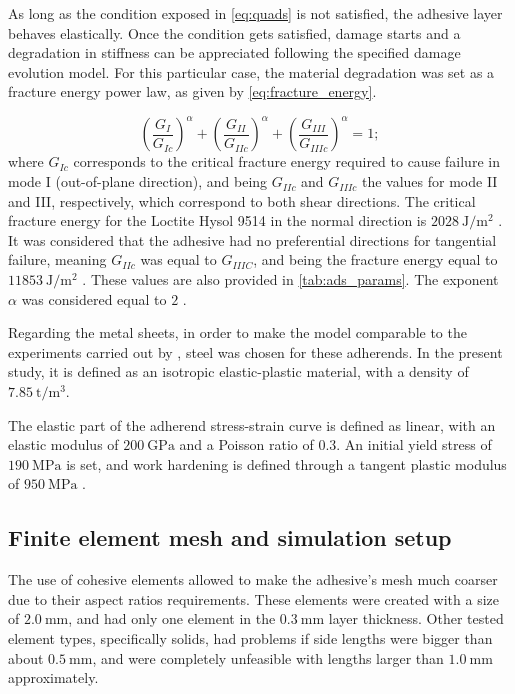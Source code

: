 \documentclass[cmfonts]{witpress}
\begin{document}
As long as the condition exposed in \cref{eq:quads} is not satisfied, the adhesive layer behaves elastically. Once the condition gets satisfied, damage starts and a degradation in stiffness can be appreciated following the specified damage evolution model. For this particular case, the material degradation was set as a fracture energy power law, as given by \cref{eq:fracture_energy}.

\begin{equation}
\left(\frac{G_{I}}{G_{Ic}}\right)^{\alpha}+\left(\frac{G_{II}}{G_{IIc}}\right)^{\alpha}+\left(\frac{G_{III}}{G_{IIIc}}\right)^{\alpha}=1 ;
\label{eq:fracture_energy}
\end{equation}
where $G_{Ic}$ corresponds to the critical fracture energy required to cause failure in mode I (out-of-plane direction), and being $G_{IIc}$ and $G_{IIIc}$ the values for mode II and III, respectively, which correspond to both shear directions. The critical fracture energy for the Loctite Hysol 9514 in the normal direction is $\SI{2028}{\J/\m^2}$ \cite{Scattina2011}. It was considered that the adhesive had no preferential directions for tangential failure, meaning $G_{IIc}$ was equal to $G_{IIIC}$, and being the fracture energy equal to $\SI{11853}{\J/\m^2}$ \cite{Scattina2011}. These values are also provided in \cref{tab:ads_params}. The exponent $\alpha$ was considered equal to $\num{2}$ \cite{Loureiro2010, Sadowski2010, SernaMoreno2015}.

Regarding the metal sheets, in order to make the model comparable to the experiments carried out by \cite{Peroni2009}, steel was chosen for these adherends. In the present study, it is defined as an isotropic elastic-plastic material, with a density of $\SI{7.85}{\tonne/\m^3}$.

The elastic part of the adherend stress-strain curve is defined as linear, with an elastic modulus of $\SI{200}{\GPa}$ and a Poisson ratio of $\num{0.3}$. An initial yield stress of $\SI{190}{\MPa}$ is set, and work hardening is defined through a tangent plastic modulus of $\SI{950}{\MPa}$ \cite{Peroni2009}.



\subsection{Finite element mesh and simulation setup}

The use of cohesive elements allowed to make the adhesive's mesh much coarser due to their aspect ratios requirements. These elements were created with a size of $\SI{2.0}{\mm}$, and had only one element in the $\SI{0.3}{\mm}$ layer thickness. Other tested element types, specifically solids, had problems if side lengths were bigger than about $\SI{0.5}{\mm}$, and were completely unfeasible with lengths larger than $\SI{1.0}{\mm}$ approximately.
\end{document}
